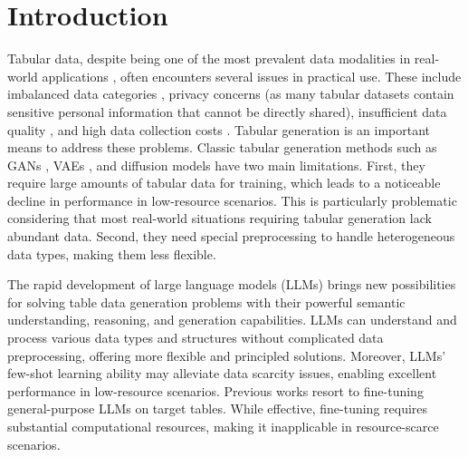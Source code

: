 \section{Introduction}

Tabular data, despite being one of the most prevalent data modalities in real-world applications \citep{benjelloun2020google}, often encounters several issues in practical use. These include imbalanced data categories \citep{cao2019learning}, privacy concerns \citep{gascon2016privacy} (as many tabular datasets contain sensitive personal information that cannot be directly shared), insufficient data quality \cite{lin2020missing}, and high data collection costs \citep{even2007economics}. Tabular generation is an important means to address these problems. Classic tabular generation methods such as GANs \citep{ctgan}, VAEs \citep{goggle}, and diffusion models \citep{stasy,codi,tabddpm,tabsyn} have two main limitations. First, they require large amounts of tabular data for training, which leads to a noticeable decline in performance in low-resource scenarios. This is particularly problematic considering that most real-world situations requiring tabular generation lack abundant data. Second, they need special preprocessing to handle heterogeneous data types, making them less flexible.


The rapid development of large language models (LLMs) brings new possibilities for solving table data generation problems with their powerful semantic understanding, reasoning, and generation capabilities. LLMs can understand and process various data types and structures without complicated data preprocessing, offering more flexible and principled solutions. Moreover, LLMs' few-shot learning ability may alleviate data scarcity issues, enabling excellent performance in low-resource scenarios. Previous works \citep{great, realtabformer, taptap, tabula, tabmt, Xu2024AreLN, Wang2024HARMONICHL} resort to fine-tuning general-purpose LLMs on target tables. While effective, fine-tuning requires substantial computational resources, making it inapplicable in resource-scarce scenarios. 

